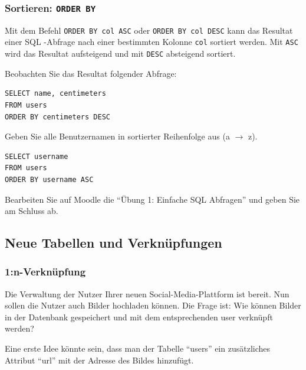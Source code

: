 \subsubsection*{Sortieren: \texorpdfstring{\lstinline|ORDER BY|}{ORDER BY}}

Mit dem Befehl \lstinline|ORDER BY col ASC| oder \lstinline|ORDER BY col DESC| kann das Resultat einer \gls{SQL} -Abfrage nach einer bestimmten Kolonne \lstinline|col| sortiert werden. Mit \lstinline|ASC| wird das Resultat aufsteigend und mit \lstinline|DESC| absteigend sortiert.

\begin{myexample}
Beobachten Sie das Resultat folgender Abfrage:

\begin{lstlisting}
SELECT name, centimeters 
FROM users 
ORDER BY centimeters DESC
\end{lstlisting}
\end{myexample}

\begin{myexercise}
  Geben Sie alle Benutzernamen in sortierter Reihenfolge aus (a $\rightarrow$ z).
  \begin{myanswer}
    \begin{lstlisting}
SELECT username
FROM users
ORDER BY username ASC
\end{lstlisting}
  \end{myanswer}
\end{myexercise}

\begin{mysubmission}
  Bearbeiten Sie auf Moodle die ``Übung 1: Einfache SQL Abfragen'' und geben Sie am Schluss ab.
\end{mysubmission}

\subsection{Neue Tabellen und Verknüpfungen}
\subsubsection{1:n-Verknüpfung}
Die Verwaltung der Nutzer Ihrer neuen Social-Media-Plattform ist bereit. Nun sollen die Nutzer auch Bilder hochladen können. Die Frage ist: Wie können Bilder in der Datenbank gespeichert und mit dem entsprechenden user verknüpft werden?

Eine erste Idee könnte sein, dass man der Tabelle \enquote{users} ein zusätzliches Attribut \enquote{url} mit der Adresse des Bildes hinzufügt.

